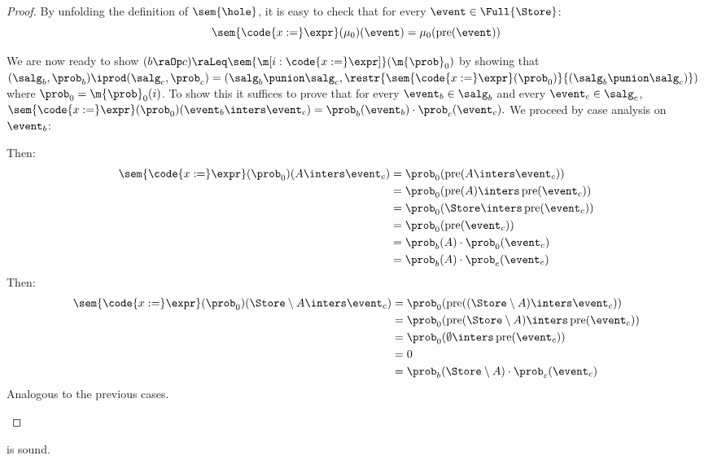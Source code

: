 \begin{proof}
  By unfolding the definition of $\sem{\hole}$,
  it is easy to check that for every $\event \in \Full{\Store}$:
  \[
    \sem{\code{x:=}\expr}(\mu_0)(\event) = \mu_0(\Pre(\event))
  \]

  We are now ready to show
  $(b \raOp c) \raLeq \sem{\m[i: \code{x:=}\expr]}(\m{\prob}_0)$
  by showing that
  $
    (\salg_b,\prob_b)\iprod(\salg_c,\prob_c)
    =
    (\salg_b \punion \salg_c,
     \restr{\sem{\code{x:=}\expr}(\prob_0)}{(\salg_b \punion \salg_c)})
  $
  where $\prob_0 = \m{\prob}_0(i)$.
  To show this it suffices to prove that
  for every $\event_b \in \salg_b$ and every $\event_c \in \salg_c$,
  $
    \sem{\code{x:=}\expr}(\prob_0)(\event_b \inters \event_c)
    = \prob_b(\event_b) \cdot \prob_c(\event_c).
  $
  We proceed by case analysis on $\event_b$:
  \begin{casesplit}
  \case[$\event_b = \specialevent$]
    Then:
    \begin{align*}
      \sem{\code{x:=}\expr}(\prob_0)(\specialevent \inters \event_c)
        &= \prob_0(\Pre(\specialevent \inters \event_c))
      \\&= \prob_0(\Pre(\specialevent) \inters \Pre(\event_c))
      \\&= \prob_0(\Store \inters \Pre(\event_c))
      \\&= \prob_0(\Pre(\event_c))
      \\&= \prob_b(\specialevent) \cdot \prob_0(\event_c)
      \\&= \prob_b(\specialevent) \cdot \prob_c(\event_c)
    \end{align*}
  \case[$\event_b = \Store \setminus \specialevent$]
    Then:
    \begin{align*}
      \sem{\code{x:=}\expr}(\prob_0)
          (\Store \setminus \specialevent \inters \event_c)
        &= \prob_0(\Pre((\Store \setminus \specialevent) \inters \event_c))
      \\&= \prob_0(\Pre(\Store \setminus \specialevent) \inters \Pre(\event_c))
      \\&= \prob_0(\emptyset \inters \Pre(\event_c))
      \\&= 0
      \\&= \prob_b(\Store \setminus \specialevent) \cdot \prob_c(\event_c)
    \end{align*}
  \case[$\event_b = \Store$ or $\event_b = \emptyset$]
    Analogous to the previous cases.
    \qedhere
  \end{casesplit}
\end{proof}
 \begin{lemma}
\label{proof:wp-samp}
   is sound.
\end{lemma}

